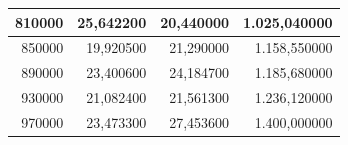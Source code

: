 \documentclass[a4paper, 12pt]{article}
\begin{document}
\begin{longtable}[c]{@{}rrrr@{}}
			\multicolumn{1}{|r|}{810000}                  & \multicolumn{1}{r|}{25,642200}         & \multicolumn{1}{r|}{20,440000}           & \multicolumn{1}{r|}{1.025,040000}      \\* \midrule
			\multicolumn{1}{|r|}{850000}                  & \multicolumn{1}{r|}{19,920500}         & \multicolumn{1}{r|}{21,290000}           & \multicolumn{1}{r|}{1.158,550000}      \\* \midrule
			\multicolumn{1}{|r|}{890000}                  & \multicolumn{1}{r|}{23,400600}         & \multicolumn{1}{r|}{24,184700}           & \multicolumn{1}{r|}{1.185,680000}      \\* \midrule
			\multicolumn{1}{|r|}{930000}                  & \multicolumn{1}{r|}{21,082400}         & \multicolumn{1}{r|}{21,561300}           & \multicolumn{1}{r|}{1.236,120000}      \\* \midrule
			\multicolumn{1}{|r|}{970000}                  & \multicolumn{1}{r|}{23,473300}         & \multicolumn{1}{r|}{27,453600}           & \multicolumn{1}{r|}{1.400,000000}      \\* \bottomrule
		\end{longtable}
	
\end{document}
